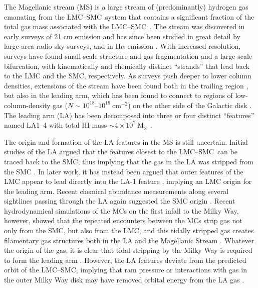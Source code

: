 \documentclass[modern]{aastex62}
\newcommand{\msun}{\textrm{M}_\odot}
\newcommand{\lmcsmc}{LMC--SMC}
\begin{document}
The Magellanic stream (MS) is a large stream of (predominantly) hydrogen gas emanating from the \lmcsmc\ system that contains a significant fraction of the total gas mass associated with the \lmcsmc\ \citep{Bruns:2005}.
The stream was discovered in early surveys of 21 cm emission and has since been studied in great detail by large-area radio sky surveys, and in H$\alpha$ emission \citep{Weiner:1996, Barger:2017}.
With increased resolution, surveys have found small-scale structure and gas fragmentation \citep[e.g.,][]{Nidever:2008, For:2014} and a large-scale bifurcation, with %
kinematically \citep{Nidever:2008} and chemically \citep{Fox:2013} distinct ``strands'' that lead back to the LMC and the SMC, respectively.
As surveys push deeper to lower column densities, extensions of the stream have been found both in the trailing region \citep{Nidever:2010}, but also in the leading arm, which has been found to connect to regions of low-column-density gas ($N\sim 10^{18}$--$10^{19}~\textrm{cm}^{-2}$) on the other side of the Galactic disk \citep{Putman:1998, Nidever:2008}.
The leading arm (LA) has been decomposed into three or four distinct ``features'' named LA1--4 \citep{Bruns:2005, Nidever:2008, Venzmer:2012} with total HI mass $\sim 4 \times10^7~\msun$ \citep{Venzmer:2012}.

The origin and formation of the LA features in the MS is still uncertain.
Initial studies of the LA argued that the features closest to the \lmcsmc\ can be traced back to the SMC, thus implying that the gas in the LA was stripped from the SMC \citep{Putman:1998}.
In later work, it has instead been argued that outer features of the LMC appear to lead directly into the LA-1 feature \citep{Nidever:2008}, implying an LMC origin for the leading arm.
Recent chemical abundance measurements along several sightlines passing through the LA again suggested the SMC origin \citep{Fox:2018, Richter:2018}.
Recent hydrodynamical simulations of the MCs on the first infall to the Milky Way, however, showed that the repeated encounters between the MCs strip gas not only from the SMC, but also from the LMC, and this tidally stripped gas creates filamentary gas structures both in the LA and the Magellanic Stream \citep{Pardy:2018}.
Whatever the origin of the gas, it is clear that tidal stripping by the Milky Way is required to form the leading arm \citep{Nidever:2008, Besla:2012}.
However, the LA features deviate from the predicted orbit of the \lmcsmc, implying that ram pressure or interactions with gas in the outer Milky Way disk may have removed orbital energy from the LA gas \citep[e.g.,][]{Bekki:2008}.
\end{document}
